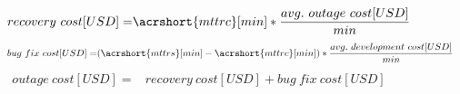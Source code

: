 \documentclass[../main.tex]{subfiles}
\begin{document}
    \begin{figure}[h]
        \begin{equation}
            \label{eq:recovery_cost}
            \begin{split}
                recovery\ cost[USD] =& \acrshort{mttrc} [min] * \frac{avg.\ outage\ cost[USD]}{min}
            \end{split}
        \end{equation}
        \begin{equation}
            \label{eq:bug_fix_cost}
            \begin{split}
                bug\ fix\ cost[USD] =& (\acrshort{mttrs} [min] - \acrshort{mttrc} [min]) * \frac{avg.\ development\ cost[USD]}{min}
            \end{split}
        \end{equation}
        \begin{equation}
            \label{eq:outage_cost}
            \begin{split}
                outage\ cost[USD] =& recovery\ cost[USD] + bug\ fix\ cost[USD]
            \end{split}
        \end{equation}
    \end{figure}
\end{document}
